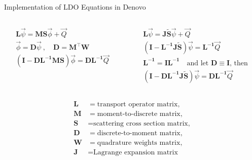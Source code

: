 \documentclass[handout]{beamer} %
\newcommand{\ve}[1]{\ensuremath{\mathbf{#1}}}
\begin{document}
\begin{frame}{Implementation of LDO Equations in Denovo}
\begin{columns}[T]
\begin{column}{0.485\textwidth}
\begin{gather*}
\ve{L}\vec{\psi} = \ve{MS}\vec{\phi} + \vec{Q}\\
\vec{\phi} = \ve{D}\vec{\psi}\:, \quad \ve{D} = \ve{M}^\intercal\ve{W} \\
\left(\ve{I} - \ve{DL^{-1} MS}\right)\vec{\phi} = \ve{DL^{-1}}\vec{Q} 
\end{gather*}
\end{column}
\begin{column}{0.515\textwidth}
\begin{gather*}
\ve{L}\vec{\psi} = \ve{J\tilde{S}}\vec{\psi} + \vec{Q}\\
\left(\ve{I} - \ve{L^{-1} J\tilde{S}}\right)\vec{\psi} = \ve{L^{-1}}\vec{Q} \\ 
\ve{L^{-1}} = \ve{I}\ve{L^{-1}} \quad \text{and let } \ve{D} \equiv \ve{I} \text{, then} \nonumber\\
\left(\ve{I} - \ve{D L^{-1} J\tilde{S}}\right)\vec{\psi} = \ve{D L^{-1}}\vec{Q}
\end{gather*}
\end{column}
\end{columns}
\vspace{0.5em}
\begin{equation*}
  \begin{aligned}
    \ve{L} &= \text{transport operator matrix},\\
    \ve{M} &= \text{moment-to-discrete matrix},\\
    \ve{S} &= \text{scattering cross section matrix,}\\
    \ve{D} &= \text{discrete-to-moment matrix},\\
    \ve{W} &= \text{quadrature weights matrix},\\
    \ve{J} &= \text{Lagrange expansion matrix}
  \end{aligned}
\end{equation*}
\end{frame}
\end{document}
